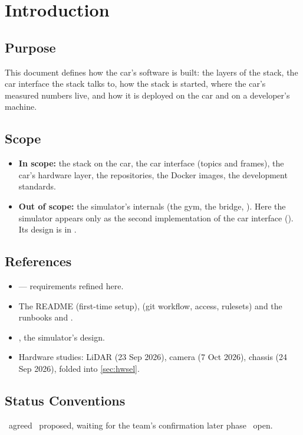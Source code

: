 \documentclass[11pt,a4paper]{article}
\newcommand{\prop}{\target{Proposed}}
\begin{document}
\section{Introduction}
\subsection{Purpose}
This document defines how the car's software is built: the layers of the stack, the car interface the stack talks to, how the stack is started, where the car's measured numbers live, and how it is deployed on the car and on a developer's machine.

\subsection{Scope}
\begin{itemize}
  \item \textbf{In scope:} the stack on the car, the car interface (topics and frames), the car's hardware layer, the repositories, the Docker images, the development standards.
  \item \textbf{Out of scope:} the simulator's internals (the gym, the bridge, ). Here the simulator appears only as the second implementation of the car interface (). Its design is in .
\end{itemize}

\subsection{References}
\begin{itemize}
  \item {} --- requirements refined here.
  \item The README (first-time setup),  (git workflow, access, rulesets) and the runbooks  and .
  \item {}, the simulator's design.
  \item Hardware studies: LiDAR (23 Sep 2026), camera (7 Oct 2026), chassis (24 Sep 2026), folded into \cref{sec:hwsel}.
\end{itemize}

\subsection{Status Conventions}
\dec\ agreed \quad \prop\ proposed, waiting for the team's confirmation \quad {} later phase \quad \tbd\ open.
\end{document}
